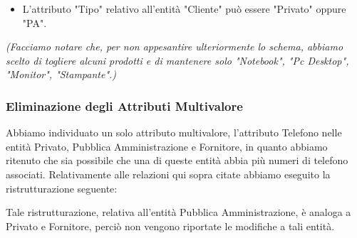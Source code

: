 \begin{itemize}
  \item L'attributo "Tipo" relativo all'entità "Cliente" può essere "Privato" oppure "PA".
\end{itemize}
\noindent
\textit{(Facciamo notare che, per non appesantire ulteriormente lo schema, abbiamo scelto di togliere alcuni prodotti e di mantenere solo "Notebook", "Pc Desktop", "Monitor", "Stampante".)}



\newpage
\begin{landscape} %



\end{landscape}


\newpage
\subsubsection{Eliminazione degli Attributi Multivalore}

Abbiamo individuato un solo attributo multivalore, l'attributo Telefono nelle entità Privato, Pubblica Amministrazione e Fornitore, in quanto abbiamo ritenuto che sia possibile che una di queste entità abbia più numeri di telefono associati.
\newline
Relativamente alle relazioni qui sopra citate abbiamo eseguito la ristrutturazione seguente:
\newline\newline

\noindent{}
\newline\newline
Tale ristrutturazione, relativa all'entità Pubblica Amministrazione, è analoga a Privato e Fornitore, perciò non vengono riportate le modifiche a tali entità.
